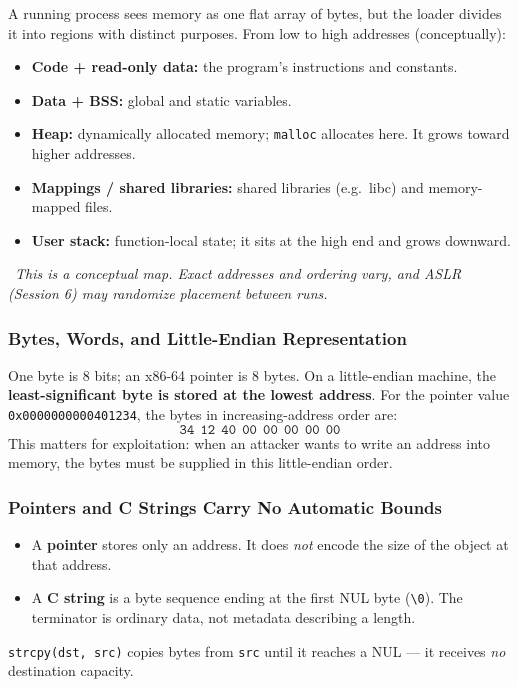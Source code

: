 \documentclass[hidelinks]{article}
\newcommand{\callout}[1]{\par\smallskip\noindent{\color{capri}$\blacktriangleright$}\ \textit{#1}\par\smallskip}
\begin{document}
A running process sees memory as one flat array of bytes, but the loader divides it into regions with distinct purposes. From low to high addresses (conceptually):
\begin{itemize}
    \item \textbf{Code + read-only data:} the program's instructions and constants.
    \item \textbf{Data + BSS:} global and static variables.
    \item \textbf{Heap:} dynamically allocated memory; \texttt{malloc} allocates here. It grows toward higher addresses.
    \item \textbf{Mappings / shared libraries:} shared libraries (e.g.\ libc) and memory-mapped files.
    \item \textbf{User stack:} function-local state; it sits at the high end and grows downward.
\end{itemize}

\callout{This is a \emph{conceptual} map. Exact addresses and ordering vary, and ASLR (Session 6) may randomize placement between runs.}

\subsubsection{Bytes, Words, and Little-Endian Representation}

One byte is 8 bits; an x86-64 pointer is 8 bytes. On a little-endian machine, the \textbf{least-significant byte is stored at the lowest address}. For the pointer value \texttt{0x0000000000401234}, the bytes in increasing-address order are:
\[
\texttt{34}\ \ \texttt{12}\ \ \texttt{40}\ \ \texttt{00}\ \ \texttt{00}\ \ \texttt{00}\ \ \texttt{00}\ \ \texttt{00}
\]
This matters for exploitation: when an attacker wants to write an address into memory, the bytes must be supplied in this little-endian order.

\subsubsection{Pointers and C Strings Carry No Automatic Bounds}

\begin{itemize}
    \item A \textbf{pointer} stores only an address. It does \emph{not} encode the size of the object at that address.
    \item A \textbf{C string} is a byte sequence ending at the first NUL byte (\texttt{\textbackslash 0}). The terminator is ordinary data, not metadata describing a length.
\end{itemize}
\texttt{strcpy(dst, src)} copies bytes from \texttt{src} until it reaches a NUL --- it receives \emph{no} destination capacity.
\end{document}
